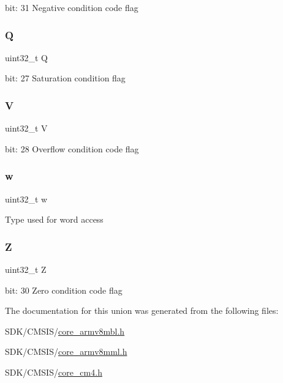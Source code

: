 bit\+: 31 Negative condition code flag \mbox{\label{union_a_p_s_r___type_a65f27ddc4f7e09c14ce7c5211b2e000a}} 
\subsubsection{\texorpdfstring{Q}{Q}}
{\footnotesize\ttfamily uint32\+\_\+t Q}

bit\+: 27 Saturation condition flag \mbox{\label{union_a_p_s_r___type_acd4a2b64faee91e4a9eef300667fa222}} 
\subsubsection{\texorpdfstring{V}{V}}
{\footnotesize\ttfamily uint32\+\_\+t V}

bit\+: 28 Overflow condition code flag \mbox{\label{union_a_p_s_r___type_ad0fb62e7a08e70fc5e0a76b67809f84b}} 
\subsubsection{\texorpdfstring{w}{w}}
{\footnotesize\ttfamily uint32\+\_\+t w}

Type used for word access \mbox{\label{union_a_p_s_r___type_a5ae954cbd9986cd64625d7fa00943c8e}} 
\subsubsection{\texorpdfstring{Z}{Z}}
{\footnotesize\ttfamily uint32\+\_\+t Z}

bit\+: 30 Zero condition code flag 

The documentation for this union was generated from the following files\+:\begin{DoxyCompactItemize}
\item 
S\+D\+K/\+C\+M\+S\+I\+S/\mbox{\hyperlink{core__armv8mbl_8h}{core\+\_\+armv8mbl.\+h}}\item 
S\+D\+K/\+C\+M\+S\+I\+S/\mbox{\hyperlink{core__armv8mml_8h}{core\+\_\+armv8mml.\+h}}\item 
S\+D\+K/\+C\+M\+S\+I\+S/\mbox{\hyperlink{core__cm4_8h}{core\+\_\+cm4.\+h}}\end{DoxyCompactItemize}
